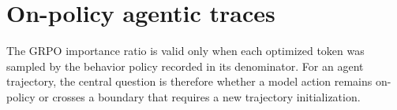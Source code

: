 \section{On-policy agentic traces}

The GRPO importance ratio is valid only when each optimized token was sampled by the
behavior policy recorded in its denominator. For an agent trajectory, the central question
is therefore whether a model action remains on-policy or crosses a boundary that requires
a new trajectory initialization.



